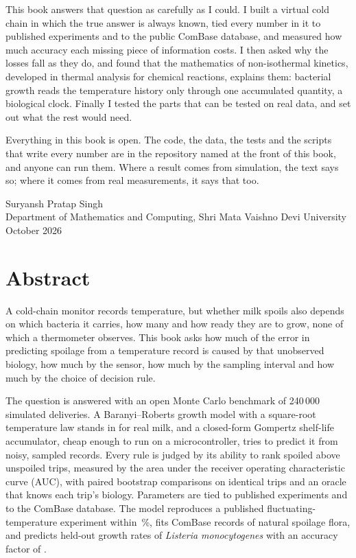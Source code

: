 \documentclass[11pt,a4paper,twoside,openany]{book}
\theoremstyle{plain}\newtheorem{proposition}{Proposition}\newtheorem{corollary}{Corollary}
\theoremstyle{definition}\newtheorem{definition}{Definition}[chapter]
\begin{document}
This book answers that question as carefully as I could. I built a virtual cold chain in which the true answer is always known, tied every number in it to published experiments and to the public ComBase database, and measured how much accuracy each missing piece of information costs. I then asked why the losses fall as they do, and found that the mathematics of non-isothermal kinetics, developed in thermal analysis for chemical reactions, explains them: bacterial growth reads the temperature history only through one accumulated quantity, a biological clock. Finally I tested the parts that can be tested on real data, and set out what the rest would need.

Everything in this book is open. The code, the data, the tests and the scripts that write every number are in the repository named at the front of this book, and anyone can run them. Where a result comes from simulation, the text says so; where it comes from real measurements, it says that too.

\vspace{10pt}
\noindent Suryansh Pratap Singh\\
Department of Mathematics and Computing, Shri Mata Vaishno Devi University\\
October 2026

\chapter*{Abstract}
A cold-chain monitor records temperature, but whether milk spoils also depends on which bacteria it carries, how many and how ready they are to grow, none of which a thermometer observes. This book asks how much of the error in predicting spoilage from a temperature record is caused by that unobserved biology, how much by the sensor, how much by the sampling interval and how much by the choice of decision rule.

The question is answered with an open Monte Carlo benchmark of 240\,000 simulated deliveries. A Baranyi--Roberts growth model with a square-root temperature law stands in for real milk, and a closed-form Gompertz shelf-life accumulator, cheap enough to run on a microcontroller, tries to predict it from noisy, sampled records. Every rule is judged by its ability to rank spoiled above unspoiled trips, measured by the area under the receiver operating characteristic curve (AUC), with paired bootstrap comparisons on identical trips and an oracle that knows each trip's biology. Parameters are tied to published experiments and to the ComBase database. The model reproduces a published fluctuating-temperature experiment within \NumLinErrAbs\,\%, fits \NumCbNfit{} ComBase records of natural spoilage flora, and predicts \NumLisHeld{} held-out growth rates of \textit{Listeria monocytogenes} with an accuracy factor of \NumLisAccHeld.
\end{document}
